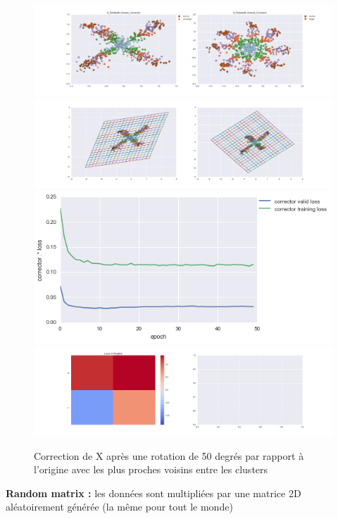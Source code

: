 \begin{figure}[H] %
\centering
\includegraphics[width=\linewidth]{fig/24-05-2016/X/X_RotatedK-closest_Corrector-DATA.png}
\includegraphics[width=\linewidth]{fig/24-05-2016/X/X_RotatedK-closest_Corrector-GridCheck.png}
\includegraphics[width=0.45\linewidth]{fig/24-05-2016/X/X_RotatedK-closest_Corrector-Learning_curve.png}
\includegraphics[width=\linewidth]{fig/24-05-2016/X/X_RotatedK-closest_Corrector-W.png}
\caption{Correction de X après une rotation de 50 degrés par rapport à l'origine avec les plus proches voisins entre les clusters}
\label{fig:recap-X-rot-exhaustive}
\end{figure}


{\Large \textbf{Random matrix :}} les données sont multipliées par une matrice 2D aléatoirement générée
 (la même pour tout le monde)

